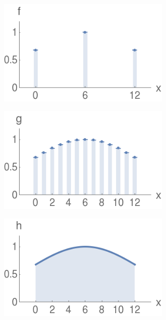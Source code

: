 \begin{figure}[ht]
   \centering
   \begin{subfigure}[b]{0.32\textwidth}
      \centering
      \includegraphics[width=0.94\textwidth]{Slike/discreteExample}
      \vspace{0mm}
      \caption{}
   \end{subfigure}
   \hspace{0mm}
   \begin{subfigure}[b]{0.32\textwidth}
      \centering
      \includegraphics[width=0.94\textwidth]{Slike/discreteExample2}
      \caption{}
   \end{subfigure}
   \hspace{0mm}
   \begin{subfigure}[b]{0.32\textwidth}
      \centering
      \includegraphics[width=0.94\textwidth]{Slike/discreteExample3}

\end{subfigure}
\end{figure}
